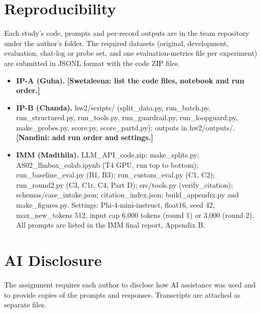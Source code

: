 \documentclass[10pt,letterpaper]{article}
\begin{document}
\section{Reproducibility}
Each study's code, prompts and per-record outputs are in the team repository under the author's folder. The required datasets (original, development, evaluation, chat-log or probe set, and one evaluation-metrics file per experiment) are submitted in JSONL format with the code ZIP files.
\begin{itemize}
\item \textbf{IP-A (Guha).} \textbf{[Swetaleena: list the code files, notebook and run order.]}
\item \textbf{IP-B (Chanda).} hw2/scripts/ (split\_\allowbreak{}data.py, run\_\allowbreak{}batch.py, run\_\allowbreak{}structured.py, run\_\allowbreak{}tools.py, run\_\allowbreak{}guardrail.py, run\_\allowbreak{}loopguard.py, make\_\allowbreak{}probes.py, score.py, score\_\allowbreak{}partd.py); outputs in hw2/outputs/. \textbf{[Nandini: add run order and settings.]}
\item \textbf{IMM (Madthila).} LLM\_\allowbreak{}API\_\allowbreak{}code.zip: make\_\allowbreak{}splits.py; AS02\_\allowbreak{}llmbox\_\allowbreak{}colab.ipynb (T4 GPU, run top to bottom); run\_\allowbreak{}baseline\_\allowbreak{}eval.py (B1, B3); run\_\allowbreak{}custom\_\allowbreak{}eval.py (C1, C2); run\_\allowbreak{}round2.py (C3, C1r, C4, Part D); src/tools.py (verify\_\allowbreak{}citation); schemas/case\_\allowbreak{}intake.json; citation\_\allowbreak{}index.json; build\_\allowbreak{}appendix.py and make\_\allowbreak{}figures.py. Settings: Phi-4-mini-instruct, float16, seed 42, max\_\allowbreak{}new\_\allowbreak{}tokens 512, input cap 6,000 tokens (round 1) or 3,000 (round 2). All prompts are listed in the IMM final report, Appendix B.
\end{itemize}

\section{AI Disclosure}
The assignment requires each author to disclose how AI assistance was used and to provide copies of the prompts and responses. Transcripts are attached as separate files.
\end{document}
